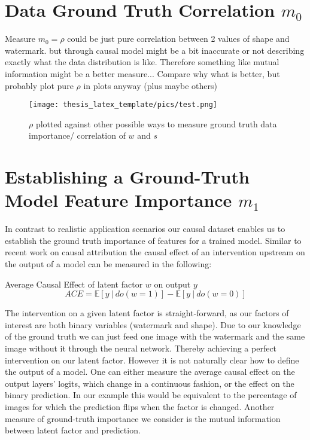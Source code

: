 \section{Data Ground Truth Correlation $m_0$}
Measure $m_0 = \rho$ could be just pure correlation between 2 values of shape and watermark. but through causal model might be a bit inaccurate or not describing exactly what the data distribution is like. Therefore something like mutual information might be a better measure...
Compare why what is better, but probably plot pure $\rho$ in plots anyway (plus maybe others)

\begin{figure}
    \centering
    \texttt{[image: thesis\_latex\_template/pics/test.png]}
    \caption{$\rho$ plotted against other possible ways to measure ground truth data importance/ correlation of $w$ and $s$}
    \label{fig:finding_rho}
\end{figure}

\section{Establishing a Ground-Truth Model Feature Importance $m_1$}\label{section:gt_measure}
In contrast to realistic application scenarios our causal dataset enables us to establish the ground truth importance of features for a trained model. Similar to recent work on causal attribution  the causal effect of an intervention upstream on the output of a model can be measured in the following:
\begin{center}
Average Causal Effect of latent factor $w$ on output $y$ \\
\begin{equation}
\displaystyle ACE = \mathbb{E} [ y \ | \ do(w=1) ] - \mathbb{E} [ y \ | \ do(w=0) ] 
\end{equation}
\end{center}
The intervention on a given latent factor is straight-forward, as our factors of interest are both binary variables (watermark and shape). Due to our knowledge of the ground truth we can just feed one image with the watermark and the same image without it through the neural network. Thereby achieving a perfect intervention on our latent factor.  
However it is not naturally clear how to define the output of a model. One can either measure the average causal effect on the output layers' logits, which change in a continuous fashion, or the effect on the binary prediction. In our example this would be equivalent to the percentage of images for which the prediction flips when the factor is changed. 
Another measure of ground-truth importance we consider is the mutual information between latent factor and prediction.

